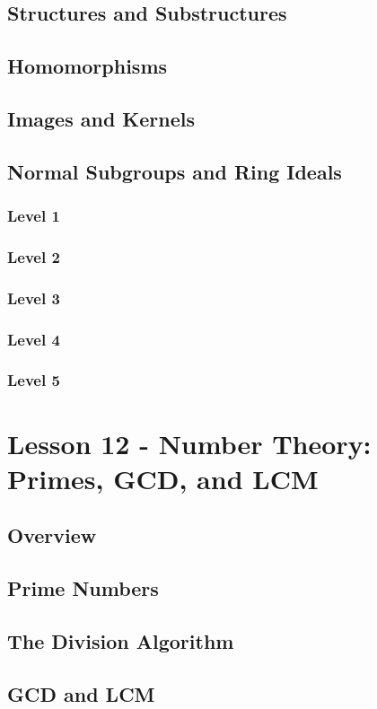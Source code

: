 \documentclass{article}
\begin{document}
\subsection{Structures and Substructures}
\subsection{Homomorphisms}
\subsection{Images and Kernels}
\subsection{Normal Subgroups and Ring Ideals}
\subsubsection{Level 1}
\subsubsection{Level 2}
\subsubsection{Level 3}
\subsubsection{Level 4}
\subsubsection{Level 5}
\pagebreak

\section{Lesson 12 - Number Theory: Primes, GCD, and LCM}
\subsection{Overview}
\subsection{Prime Numbers}
\subsection{The Division Algorithm}
\subsection{GCD and LCM}
\end{document}

